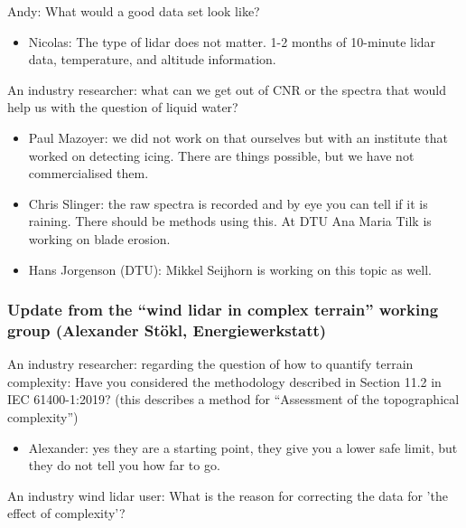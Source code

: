 Andy: What would a good data set look like?

\begin{itemize}
\item Nicolas: The type of lidar does not matter. 1-2 months of 10-minute lidar data, temperature, and altitude information.
\end{itemize}

An industry researcher: what can we get out of CNR or the spectra that would help us with the question of liquid water?

\begin{itemize}
\item Paul Mazoyer: we did not work on that ourselves but with an institute   that worked on detecting icing. There are things possible, but we have not commercialised them.
\item Chris Slinger: the raw spectra is recorded and by eye you can tell if it is raining. There should be methods using this. At DTU Ana Maria Tilk is working on blade erosion.
\item Hans Jorgenson (DTU): Mikkel Seijhorn is working on this topic as well.
\end{itemize}

\subsubsection[Update from the \enquote{wind lidar in complex terrain} working group]{Update from the \enquote{wind lidar in complex terrain} working group (Alexander Stökl, Energiewerkstatt)}
\label{sec:news-complex-terrain-group}

An industry researcher: regarding the question of how to quantify terrain complexity: Have you considered the methodology described in Section 11.2 in IEC 61400-1:2019? (this describes a method for \enquote{Assessment of the topographical complexity})

\begin{itemize}
\item Alexander: yes they are a starting point, they give you a lower safe limit, but they do not tell you how far to go.
\end{itemize}

An industry wind lidar user: What is the reason for correcting the data for 'the effect of complexity'?

